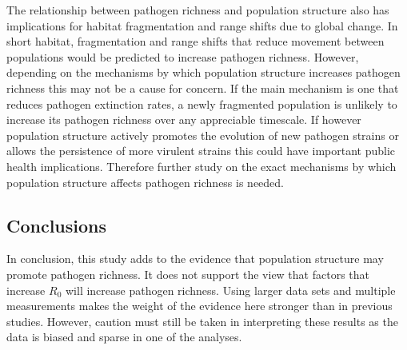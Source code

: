 The relationship between pathogen richness and population structure also has implications for habitat fragmentation and range shifts due to global change.
In short habitat, fragmentation and range shifts that reduce movement between populations would be predicted to increase pathogen richness.
However, depending on the mechanisms by which population structure increases pathogen richness this may not be a cause for concern.
If the main mechanism is one that reduces pathogen extinction rates, a newly fragmented population is unlikely to increase its pathogen richness over any appreciable timescale.
If however population structure actively promotes the evolution of new pathogen strains or allows the persistence of more virulent strains \cite{blackwood2013resolving, pons2014insights, plowright2011urban} this could have important public health implications.
Therefore further study on the exact mechanisms by which population structure affects pathogen richness is needed. 

\subsection{Conclusions}

In conclusion, this study adds to the evidence that population structure may promote pathogen richness.
It does not support the view that factors that increase $R_0$ will increase pathogen richness.
Using larger data sets and multiple measurements makes the weight of the evidence here stronger than in previous studies.
However, caution must still be taken in interpreting these results as the data is biased and sparse in one of the analyses.






















